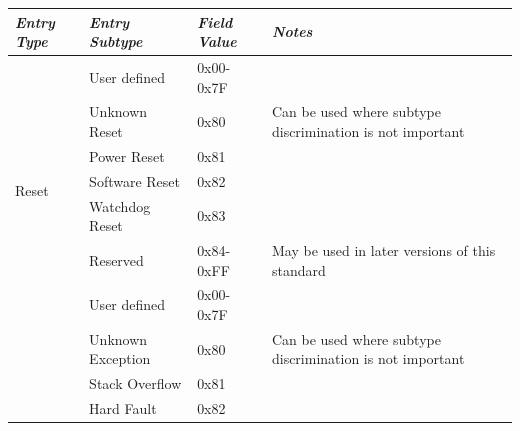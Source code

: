 \documentclass[paper=letter, fontsize=10pt]{scrartcl} %
\numberwithin{equation}{section} %
\numberwithin{figure}{section} %
\numberwithin{table}{section} %
\begin{document}
\begin{table}[ht!]
    \begin{center}
        \begin{tabularx}{\textwidth}{|l|l|l|X|}
            \hline
            \emph{Entry Type}               & \emph{Entry Subtype}      & \emph{Field Value} & \emph{Notes}                                                       \\ \hline
            \multirow{7}{*}{Reset}          & User defined              & 0x00-0x7F          &                                                                    \\ \cline{2-4}
            \textbf{}                       & Unknown Reset             & 0x80               & Can be used where subtype discrimination is not important          \\ \cline{2-4}
            \textbf{}                       & Power Reset               & 0x81               &                                                                    \\ \cline{2-4}
            \textbf{}                       & Software Reset            & 0x82               &                                                                    \\ \cline{2-4}
            \textbf{}                       & Watchdog Reset            & 0x83               &                                                                    \\ \cline{2-4}
            \textbf{}                       & Reserved                  & 0x84-0xFF          & May be used in later versions of this standard                     \\ \hline
            \multirow{8}{*}{Exception}      & User defined              & 0x00-0x7F          &                                                                    \\ \cline{2-4}
            \textbf{}                       & Unknown Exception         & 0x80               & Can be used where subtype discrimination is not important          \\ \cline{2-4}
            \textbf{}                       & Stack Overflow            & 0x81               &                                                                    \\ \cline{2-4}
            \textbf{}                       & Hard Fault                & 0x82               &                                                                    \\ \cline{2-4}

\end{tabularx}
\end{center}
\end{table}
\end{document}
